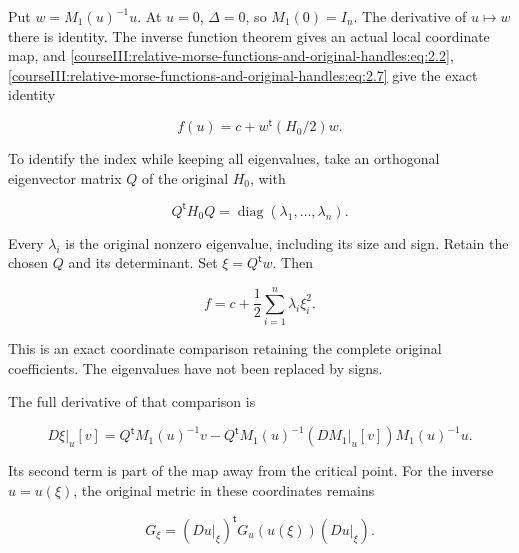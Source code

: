 Put \(w=M_1(u)^{-1}u\). At \(u=0\), \(\Delta=0\), so \(M_1(0)=I_n\). The derivative of \(u\mapsto w\) there is identity. The inverse function theorem gives an actual local coordinate map, and \eqref{courseIII:relative-morse-functions-and-original-handles:eq:2.2}, \eqref{courseIII:relative-morse-functions-and-original-handles:eq:2.7} give the exact identity

\begin{equation}
f(u)=c+w^{\mathsf t}(H_0/2)w.
\label{courseIII:relative-morse-functions-and-original-handles:eq:2.8}
\end{equation}

To identify the index while keeping all eigenvalues, take an orthogonal eigenvector matrix \(Q\) of the original \(H_0\), with

\begin{equation}
Q^{\mathsf t}H_0Q=\operatorname{diag}(\lambda_1,\ldots,\lambda_n).
\label{courseIII:relative-morse-functions-and-original-handles:eq:2.9}
\end{equation}

Every \(\lambda_i\) is the original nonzero eigenvalue, including its size and sign. Retain the chosen \(Q\) and its determinant. Set \(\xi=Q^{\mathsf t}w\). Then

\begin{equation}
f=c+\frac12\sum_{i=1}^n\lambda_i\xi_i^2.
\label{courseIII:relative-morse-functions-and-original-handles:eq:2.10}
\end{equation}

This is an exact coordinate comparison retaining the complete original coefficients. The eigenvalues have not been replaced by signs.

The full derivative of that comparison is

\begin{equation}
D\xi|_u[v]
=Q^{\mathsf t}M_1(u)^{-1}v
-Q^{\mathsf t}M_1(u)^{-1}
 (DM_1|_u[v])M_1(u)^{-1}u.
\label{courseIII:relative-morse-functions-and-original-handles:eq:2.11}
\end{equation}

Its second term is part of the map away from the critical point. For the inverse \(u=u(\xi)\), the original metric in these coordinates remains

\begin{equation}
G_\xi=(Du|_\xi)^{\mathsf t}G_u(u(\xi))(Du|_\xi).
\label{courseIII:relative-morse-functions-and-original-handles:eq:2.12}
\end{equation}

